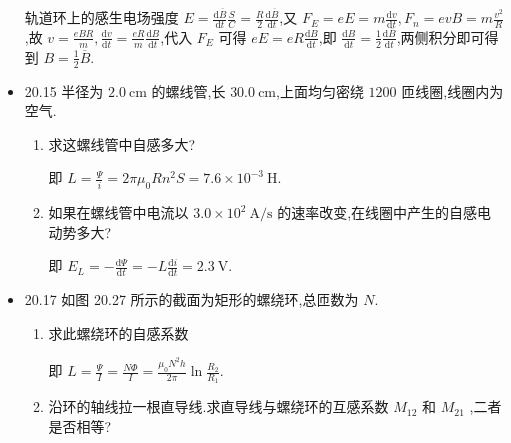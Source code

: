 \begin{itemize}
            轨道环上的感生电场强度 $E=\frac{\mathrm{d}\overline{B}}{\mathrm{d}t}\frac{S}{C}=\frac{R}{2}\frac{\mathrm{d}\overline{B}}{\mathrm{d}t}$,又 $F_{E}=eE=m\frac{\mathrm{d}v}{\mathrm{d}t},F_{n}=evB=m \frac{v^2}{R}$,故 $v=\frac{eBR}{m},\frac{\mathrm{d}v}{\mathrm{d}t}=\frac{eR}{m}\frac{\mathrm{d}B}{\mathrm{d}t}$,代入 $F_{E}$ 可得 $eE=eR \frac{\mathrm{d}B}{\mathrm{d}t}$,即 $\frac{\mathrm{d}B}{\mathrm{d}t}=\frac{1}{2} \frac{\mathrm{d}\overline{B}}{\mathrm{d}t}$,两侧积分即可得到 $B=\frac{1}{2}\overline{B}$.
        \item 20.15 半径为 $2.0 \ \mathrm{cm}$ 的螺线管,长 $30.0 \ \mathrm{cm}$,上面均匀密绕 $1200$ 匝线圈,线圈内为空气.
            \begin{enumerate}
                \item 求这螺线管中自感多大?

                    即 $L=\frac{\Psi}{i}=2\pi \mu_0 Rn^2S=7.6\times 10^{-3} \ \mathrm{H}$.
                \item 如果在螺线管中电流以 $3.0\times 10^{2} \ \mathrm{A / s}$ 的速率改变,在线圈中产生的自感电动势多大?

                    即 $E_{L}=-\frac{\mathrm{d}\Psi}{\mathrm{d}t}=-L \frac{\mathrm{d}i}{\mathrm{d}t}=2.3 \ \mathrm{V}$.
            \end{enumerate}
        \item 20.17 如图 20.27 所示的截面为矩形的螺绕环,总匝数为 $N$.
            \begin{enumerate}
                \item 求此螺绕环的自感系数

                    即 $L=\frac{\Psi}{I}=\frac{N\Phi}{I}=\frac{\mu_0 N^2 h}{2\pi} \ln \frac{R_2}{R_1}$.
                \item 沿环的轴线拉一根直导线.求直导线与螺绕环的互感系数 $M_{12}$ 和 $M_{21}$ ,二者是否相等?


\end{enumerate}
\end{itemize}

